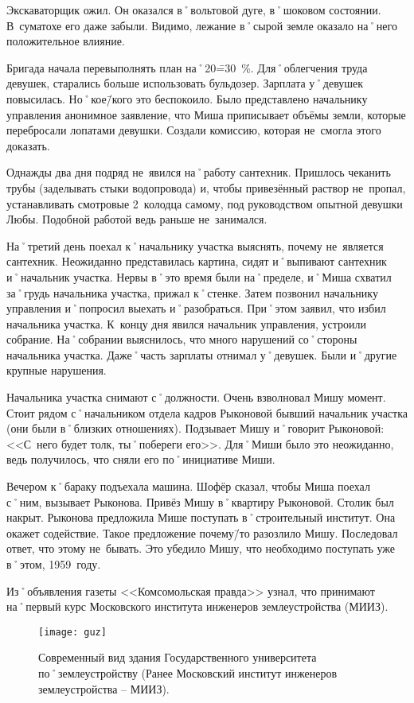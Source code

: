Экскаваторщик ожил. Он оказался в˚вольтовой дуге, в˚шоковом состоянии. В~суматохе его даже забыли. Видимо, лежание в˚сырой земле оказало на˚него положительное влияние. 

Бригада начала перевыполнять план на˚20\==30~\%. Для˚облегчения труда девушек, старались больше использовать бульдозер. Зарплата у˚девушек повысилась. Но˚кое\=/кого это беспокоило. Было представлено начальнику управления анонимное заявление, что Миша приписывает объёмы земли, которые перебросали лопатами девушки. Создали комиссию, которая не~смогла этого доказать.

Однажды два дня подряд не~явился на˚работу сантехник. Пришлось чеканить трубы (заделывать стыки водопровода) и, чтобы привезённый раствор не~пропал, устанавливать смотровые 2~колодца самому, под руководством опытной девушки Любы. Подобной работой ведь раньше не~занимался.

На˚третий день поехал к˚начальнику участка выяснять, почему не~является сантехник. Неожиданно представилась картина, сидят и˚выпивают сантехник и˚начальник участка. Нервы в˚это время были на˚пределе, и˚Миша схватил за˚грудь начальника участка, прижал к˚стенке. Затем позвонил начальнику управления и˚попросил выехать и˚разобраться. При˚этом заявил, что избил начальника участка. К~концу дня явился начальник управления, устроили собрание. На˚собрании выяснилось, что много нарушений со˚стороны начальника участка. Даже˚часть зарплаты отнимал у˚девушек. Были и˚другие крупные нарушения.

Начальника участка снимают с˚должности. Очень взволновал Мишу момент. Стоит рядом с˚начальником отдела кадров Рыконовой бывший начальник участка (они были в˚близких отношениях). Подзывает Мишу и˚говорит Рыконовой: <<С~него будет толк, ты˚побереги его>>. Для˚Миши было это неожиданно, ведь получилось, что сняли его по˚инициативе Миши. 

Вечером к˚бараку подъехала машина. Шофёр сказал, чтобы Миша поехал с˚ним, вызывает Рыконова. Привёз Мишу в˚квартиру Рыконовой. Столик был накрыт. Рыконова предложила Мише поступать в˚строительный институт. Она окажет содействие. Такое предложение почему\=/то разозлило Мишу. Последовал ответ, что этому не~бывать. Это убедило Мишу, что необходимо поступать уже в˚этом, 1959~году.

Из˚объявления газеты <<Комсомольская правда>> узнал, что принимают на˚первый курс Московского института инженеров землеустройства (МИИЗ).

\begin{wrapfigure}{O}{.4\textwidth}
\centering
\texttt{[image: guz]}
\caption[{Современный вид здания Государственного университета по˚землеустройству (Ранее Московский институт инженеров землеустройства \--- МИИЗ).}]{Современный вид здания Государственного университета по˚землеустройству (Ранее Московский институт инженеров землеустройства \--- МИИЗ)\footnotemark.}
\label{fig:guz}
\end{wrapfigure}

